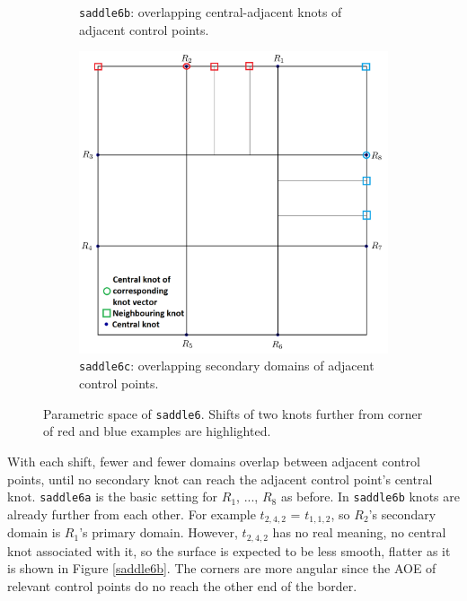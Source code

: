 \documentclass{article}
\begin{document}
\begin{figure}[H]
\begin{subfigure}[b]{0.32\textwidth}
\caption{\texttt{saddle6b}: overlapping central-adjacent knots of adjacent control points.}
\label{saddle6bp}
\end{subfigure}
\begin{subfigure}[b]{0.32\textwidth}
\includegraphics[width=\textwidth]{saddle6cparam}
\caption{\texttt{saddle6c}: overlapping secondary domains of adjacent control points.}
\label{saddle6cp}
\end{subfigure}
\caption{Parametric space of \texttt{saddle6}. Shifts of two knots further from corner of red and blue examples are highlighted.}
\label{saddle6p}
\end{figure}

With each shift, fewer and fewer domains overlap between adjacent control points, until no secondary knot can reach the adjacent control point's central knot. \texttt{saddle6a} is the basic setting for $R_1$, ..., $R_8$ as before. In \texttt{saddle6b} knots are already further from each other. For example $t_{2, 4, 2}$ = $t_{1, 1, 2}$, so $R_2$'s secondary domain is $R_1$'s primary domain. However, $t_{2, 4, 2}$ has no real meaning, no central knot associated with it, so the surface is expected to be less smooth, flatter as it is shown in Figure \ref{saddle6b}. The corners are more angular since the AOE of relevant control points do no reach the other end of the border.
\end{document}
